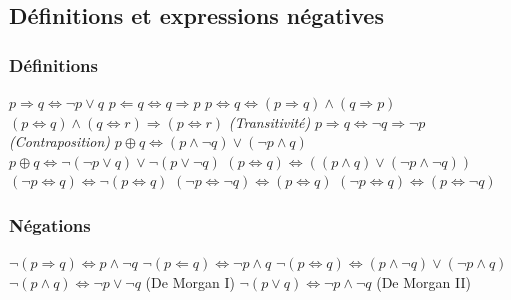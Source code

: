 \documentclass[12]{article}%
\theoremstyle{plain}
\theoremstyle{definition}
\theoremstyle{remark}
\begin{document}
\subsection{Définitions et expressions négatives}
\subsubsection{Définitions}
\( p \Rightarrow q \iff \lnot p \lor q \)
\newline
\newline
\( p \Leftarrow q \iff q \Rightarrow p \)
\newline
\newline
\(p \Leftrightarrow q \iff (p \Rightarrow q) \land (q \Rightarrow p) \)
\newline
\newline
\( (p \Leftrightarrow q) \land (q \Leftrightarrow r) \Rightarrow (p \Leftrightarrow r) \) \textit{(Transitivité)}
\newline
\newline
\( p \Rightarrow q \iff \neg q \Rightarrow \neg p \) \textit{(Contraposition)}
\newline
\newline
\( p \oplus q \iff ( p \land \lnot q) \lor (\lnot p \land q) \)
\newline
\newline
\( p \oplus q \iff \lnot ( \lnot p \lor q) \lor \lnot(p \lor \lnot q) \)
\newline
\newline
\( (p \iff q) \iff ((p \land q) \lor (\lnot p \land \lnot q)) \)
\newline
\newline
\( (\lnot p \iff q) \iff \lnot(p \iff q) \)
\newline
\newline
\( (\lnot p \iff \lnot q) \iff (p \iff q) \)
\newline
\newline
\( (\lnot p \iff q) \iff (p \iff \lnot q) \)

\subsubsection{Négations}
\( \lnot (p \Rightarrow q) \iff p \land \lnot q \)
\newline
\newline
\( \lnot (p \Leftarrow q) \iff \lnot p \land q \)
\newline
\newline
\( \lnot (p \Leftrightarrow q) \iff (p \land \lnot q) \lor (\lnot p \land q) \)
\newline
\newline
\( \lnot (p \land q) \iff \lnot p \lor \lnot q \) (De Morgan I)
\newline
\newline
\( \lnot (p \lor q) \iff \lnot p \land \lnot q \) (De Morgan II)
\end{document}
